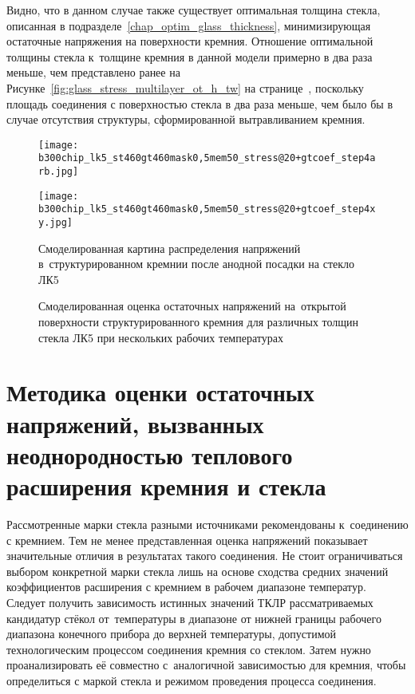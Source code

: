 Видно, что в данном случае также существует оптимальная толщина стекла,
описанная в подразделе~\ref{chap_optim_glass_thickness}, минимизирующая
остаточные напряжения на поверхности кремния. Отношение оптимальной толщины
стекла к~толщине кремния в данной модели примерно в два раза меньше, чем
представлено ранее на Рисунке~\ref{fig:glass_stress_multilayer_ot_h_tw} на
странице~\pageref{fig:glass_stress_multilayer_ot_h_tw}, поскольку площадь соединения с
поверхностью стекла в два раза меньше, чем было бы в случае отсутствия
структуры, сформированной вытравливанием кремния.

\begin{figure}[!hb]
    \centering
    \texttt{[image: b300chip\_lk5\_st460gt460mask0,5mem50\_stress@20+gtcoef\_step4arb.jpg]}\par%
    \texttt{[image: b300chip\_lk5\_st460gt460mask0,5mem50\_stress@20+gtcoef\_step4xy.jpg]}%

    \caption{Смоделированная картина распределения напряжений
    в~структурированном кремнии после анодной посадки на стекло ЛК5}
    \label{fig:si_membrane_bonded_3d}
\end{figure}

\begin{figure}[!hb]
    \hspace{1.5em}%

    \caption{Смоделированная оценка остаточных напряжений на~открытой
    поверхности структурированного кремния для различных толщин стекла ЛК5 при нескольких
    рабочих температурах}
    \label{fig:si_membrane_third_inv_stress}
\end{figure}

\section{Методика оценки остаточных напряжений, вызванных неоднородностью теплового расширения кремния и стекла}
Рассмотренные марки стекла разными источниками рекомендованы
к~соединению с кремнием. Тем не менее представленная оценка напряжений
показывает значительные отличия в результатах такого соединения.
Не стоит ограничиваться выбором конкретной
марки стекла лишь на основе сходства средних значений коэффициентов
расширения с кремнием в рабочем диапазоне температур.
Следует получить
зависимость истинных значений ТКЛР рассматриваемых кандидатур стёкол
от~температуры в диапазоне от нижней границы рабочего диапазона
конечного прибора до верхней температуры, допустимой технологическим
процессом соединения кремния со стеклом. Затем нужно проанализировать
её совместно с~аналогичной зависимостью для кремния, чтобы
определиться с маркой стекла и режимом проведения процесса соединения.

